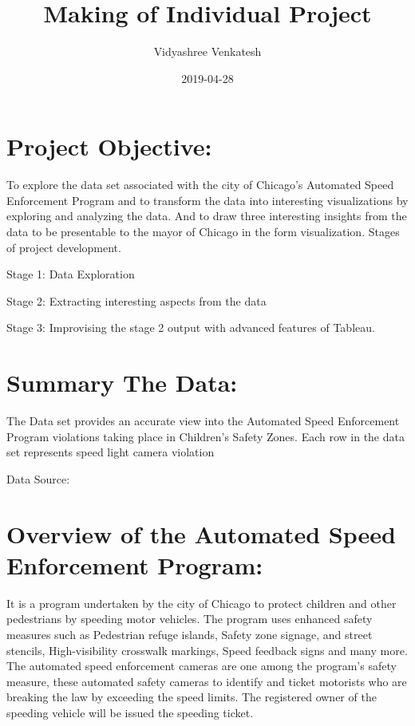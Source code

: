 \documentclass[]{book}
\title{Making of Individual Project}
\author{Vidyashree Venkatesh}
\date{2019-04-28}
\begin{document}
\maketitle

{
\setcounter{tocdepth}{1}
\tableofcontents
}
\hypertarget{project-objective}{%
\chapter{Project Objective:}\label{project-objective}}

To explore the data set associated with the city of Chicago's Automated Speed Enforcement Program and to transform the data into interesting visualizations by exploring and analyzing the data. And to draw three interesting insights from the data to be presentable to the mayor of Chicago in the form visualization. Stages of project development.

Stage 1: Data Exploration

Stage 2: Extracting interesting aspects from the data

Stage 3: Improvising the stage 2 output with advanced features of Tableau.

\hypertarget{summary-the-data}{%
\chapter{Summary The Data:}\label{summary-the-data}}

The Data set provides an accurate view into the Automated Speed Enforcement Program violations taking place in Children's Safety Zones.
Each row in the data set represents speed light camera violation

Data Source: \citep{data}

\hypertarget{overview-of-the-automated-speed-enforcement-program}{%
\chapter{Overview of the Automated Speed Enforcement Program:}\label{overview-of-the-automated-speed-enforcement-program}}

It is a program undertaken by the city of Chicago to protect children and other pedestrians by speeding motor vehicles. The program uses enhanced safety measures such as Pedestrian refuge islands, Safety zone signage, and street stencils, High-visibility crosswalk markings, Speed feedback signs and many more. The automated speed enforcement cameras are one among the program's safety measure, these automated safety cameras to identify and ticket motorists who are breaking the law by exceeding the speed limits. The registered owner of the speeding vehicle will be issued the speeding ticket.
\citep{program}
\end{document}
